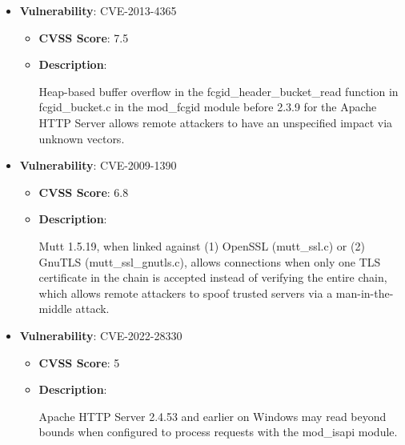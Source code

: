 \documentclass{article}
\begin{document}
\begin{itemize}
        \item \textbf{Vulnerability}: CVE-2013-4365
        \begin{itemize}
            \item \textbf{CVSS Score}:  7.5 
            \item \textbf{Description}:
            \parbox[t]{0.9\linewidth}{
                \ttfamily Heap-based buffer overflow in the fcgid\_header\_bucket\_read function in fcgid\_bucket.c in the mod\_fcgid module before 2.3.9 for the Apache HTTP Server allows remote attackers to have an unspecified impact via unknown vectors.
            }
        \end{itemize}
    
        \item \textbf{Vulnerability}: CVE-2009-1390
        \begin{itemize}
            \item \textbf{CVSS Score}:  6.8 
            \item \textbf{Description}:
            \parbox[t]{0.9\linewidth}{
                \ttfamily Mutt 1.5.19, when linked against (1) OpenSSL (mutt\_ssl.c) or (2) GnuTLS (mutt\_ssl\_gnutls.c), allows connections when only one TLS certificate in the chain is accepted instead of verifying the entire chain, which allows remote attackers to spoof trusted servers via a man-in-the-middle attack.
            }
        \end{itemize}
    
        \item \textbf{Vulnerability}: CVE-2022-28330
        \begin{itemize}
            \item \textbf{CVSS Score}:  5 
            \item \textbf{Description}:
            \parbox[t]{0.9\linewidth}{
                \ttfamily Apache HTTP Server 2.4.53 and earlier on Windows may read beyond bounds when configured to process requests with the mod\_isapi module.
            }
        \end{itemize}
    

\end{itemize}
\end{document}
